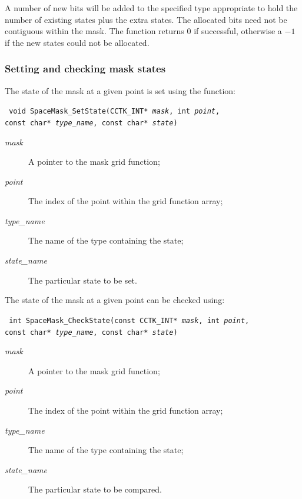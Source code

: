 \documentclass{article}
\begin{document}
\noindent A number of new bits will be added to the specified type
appropriate to hold the number of existing states plus the extra
states. The allocated bits need not be contiguous within the mask.
The function returns $0$ if successful, otherwise a $-1$ if the new
states could not be allocated.


\subsubsection{Setting and checking mask states}

The state of the mask at a given point is set using the function:

\indent\parbox{\linewidth}{
\vspace{\baselineskip}\noindent\texttt{
void SpaceMask\_SetState(CCTK\_INT* \emph{mask}, int \emph{point},
  \\\hspace*{10mm}
  const char* \emph{type\_name}, const char* \emph{state})
}\\
\hspace*{10mm}\parbox{\linewidth}{
\begin{description}
  \item[\emph{mask}] A pointer to the mask grid function;
  \item[\emph{point}] The index of the point within the grid function
    array;
  \item[\emph{type\_name}] The name of the type containing the state;
  \item[\emph{state\_name}] The particular state to be set.
\end{description}
}}

The state of the mask at a given point can be checked using:

\indent\parbox{\linewidth}{
\vspace{\baselineskip}\noindent\texttt{
int SpaceMask\_CheckState(const CCTK\_INT* \emph{mask}, int \emph{point},
  \\\hspace*{10mm}
  const char* \emph{type\_name}, const char* \emph{state})
}\\
\hspace*{10mm}\parbox{\linewidth}{
\begin{description}
  \item[\emph{mask}] A pointer to the mask grid function;
  \item[\emph{point}] The index of the point within the grid function
    array;
  \item[\emph{type\_name}] The name of the type containing the state;
  \item[\emph{state\_name}] The particular state to be compared.
\end{description}
}}
\end{document}

